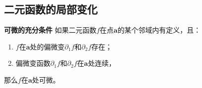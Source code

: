 \documentclass[12pt,UTF8]{ctexbook}
\begin{document}
\begin{appendix}

\section{二元函数的局部变化}
\begin{tm}{\textbf{可微的充分条件}}\label{tm:a-1-0}
如果二元函数$f$在点$\mathbf{a}$的某个邻域内有定义，且：
\begin{enumerate}[label=\arabic*.]
\item $f$在$\mathbf{a}$处的偏微变$\partial_1 f$和$\partial_2 f$存在；
\item 偏微变函数$\partial_1 f$和$\partial_2 f$在$\mathbf{a}$处连续，
\end{enumerate}
那么$f$在$\mathbf{a}$处可微。
\end{tm}


\end{appendix}
\end{document}
